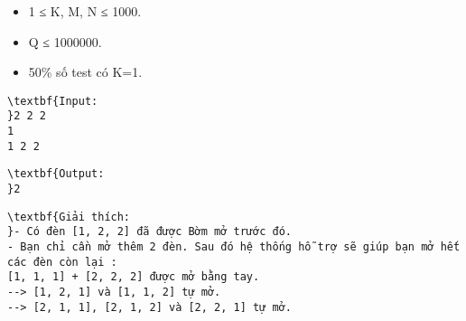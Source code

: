 \begin{itemize}
	\item 1 ≤ K, M, N ≤ 1000.
	\item Q ≤ 1000000.
	\item 50\% số test có K=1.
\end{itemize}
\begin{verbatim}
\textbf{Input:
}2 2 2
1
1 2 2\end{verbatim}
\begin{verbatim}
\textbf{Output:
}2\end{verbatim}
\begin{verbatim}
\textbf{Giải thích:
}- Có đèn [1, 2, 2] đã được Bờm mở trước đó.
- Bạn chỉ cần mở thêm 2 đèn. Sau đó hệ thống hỗ trợ sẽ giúp bạn mở hết các đèn còn lại :
[1, 1, 1] + [2, 2, 2] được mở bằng tay.
--> [1, 2, 1] và [1, 1, 2] tự mở.
--> [2, 1, 1], [2, 1, 2] và [2, 2, 1] tự mở.
\end{verbatim}
